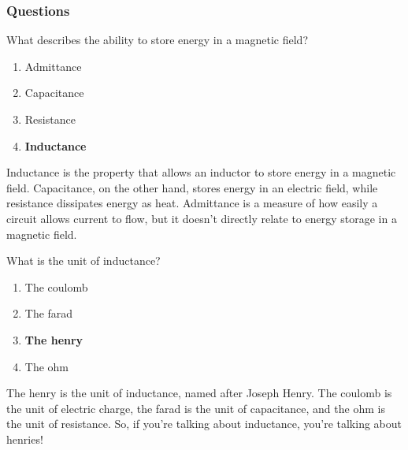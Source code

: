 \subsubsection*{Questions}

\begin{tcolorbox}[colback=gray!10!white,colframe=black!75!black,title={T5C03}]
    What describes the ability to store energy in a magnetic field?
    \begin{enumerate}[label=\Alph*),noitemsep]
        \item Admittance
        \item Capacitance
        \item Resistance
        \item \textbf{Inductance}
    \end{enumerate}
\end{tcolorbox}

Inductance is the property that allows an inductor to store energy in a magnetic field. Capacitance, on the other hand, stores energy in an electric field, while resistance dissipates energy as heat. Admittance is a measure of how easily a circuit allows current to flow, but it doesn't directly relate to energy storage in a magnetic field.

\begin{tcolorbox}[colback=gray!10!white,colframe=black!75!black,title={T5C04}]
    What is the unit of inductance?
    \begin{enumerate}[label=\Alph*),noitemsep]
        \item The coulomb
        \item The farad
        \item \textbf{The henry}
        \item The ohm
    \end{enumerate}
\end{tcolorbox}

The henry is the unit of inductance, named after Joseph Henry. The coulomb is the unit of electric charge, the farad is the unit of capacitance, and the ohm is the unit of resistance. So, if you're talking about inductance, you're talking about henries!
